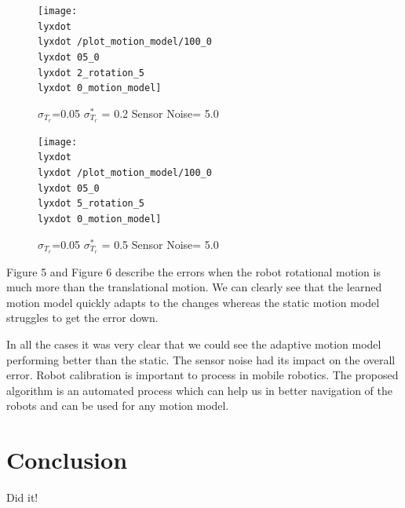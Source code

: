 \documentclass[12pt]{dalcsthesis}
\begin{document}
\begin{figure}
\caption{$\sigma_{T_{r}}$=0.05 $\sigma_{T_{r}}^{*}$ = 0.2 Sensor Noise= 5.0}


\texttt{[image: \\lyxdot \\lyxdot /plot\_motion\_model/100\_0\\lyxdot 05\_0\\lyxdot 2\_rotation\_5\\lyxdot 0\_motion\_model]}

\end{figure}


\begin{figure}
\caption{$\sigma_{T_{r}}$=0.05 $\sigma_{T_{r}}^{*}$ = 0.5 Sensor Noise= 5.0}


\texttt{[image: \\lyxdot \\lyxdot /plot\_motion\_model/100\_0\\lyxdot 05\_0\\lyxdot 5\_rotation\_5\\lyxdot 0\_motion\_model]}

\end{figure}


Figure 5 and Figure 6 describe the errors when the robot rotational
motion is much more than the translational motion. We can clearly
see that the learned motion model quickly adapts to the changes whereas
the static motion model struggles to get the error down. 

In all the cases it was very clear that we could see the adaptive
motion model performing better than the static. The sensor noise had
its impact on the overall error. Robot calibration is important to
process in mobile robotics. The proposed algorithm is an automated
process which can help us in better navigation of the robots and can
be used for any motion model. 

\chapter{Conclusion}

Did it!



\end{document}

